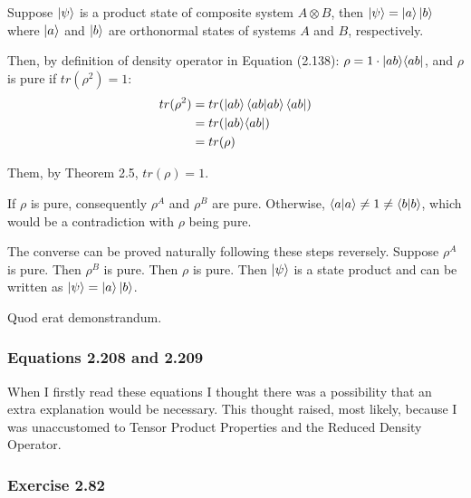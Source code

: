 Suppose $\ket{\psi}$ is a product state of composite system
$A \otimes B$, then $\ket{\psi} = \ket{a}\ket{b}$ where
$\ket{a}$ and $\ket{b}$ are orthonormal states of systems
$A$ and $B$, respectively.

Then, by definition of density operator in Equation (2.138):
$\rho = 1 \cdot \mathop{\mathinner{ |{ab}\rangle \langle{ab}|}}$, and $\rho$ is pure if $tr(\rho^2) = 1$:
\begin{align}
    tr(\rho^2) &= tr(\ket{ab}\mathop{\mathinner{ \langle{ab}|{ab}\rangle}}\bra{ab}) \\
    &= tr(\mathop{\mathinner{ |{ab}\rangle \langle{ab}|}}) \\
    &= tr(\rho)
\end{align}

Them, by Theorem 2.5, $tr(\rho) = 1$.

If $\rho$ is pure, consequently $\rho^A$ and $\rho^B$ are pure.
Otherwise, $\mathop{\mathinner{ \langle{a}|{a}\rangle}} \neq 1 \neq \mathop{\mathinner{ \langle{b}|{b}\rangle}}$,
which would be a contradiction with $\rho$ being pure.

The converse can be proved naturally following these steps reversely.
Suppose $\rho^A$ is pure. Then $\rho^B$ is pure. Then $\rho$ is pure.
Then $\ket{\psi}$ is a state product and can be written as
$\ket{\psi} = \ket{a} \ket{b}$.

Quod erat demonstrandum.


\subsubsection{Equations 2.208 and 2.209}
\label{sec:nielsen-and-chuang-equations-2-208-209}
When I firstly read these equations I thought there was a possibility that
an extra explanation would be necessary.
This thought raised, most likely,
because I was unaccustomed to Tensor Product Properties and
the Reduced Density Operator.


\subsubsection{Exercise 2.82}
\label{sec:nielsen-and-chuang-exercise-2-82}

